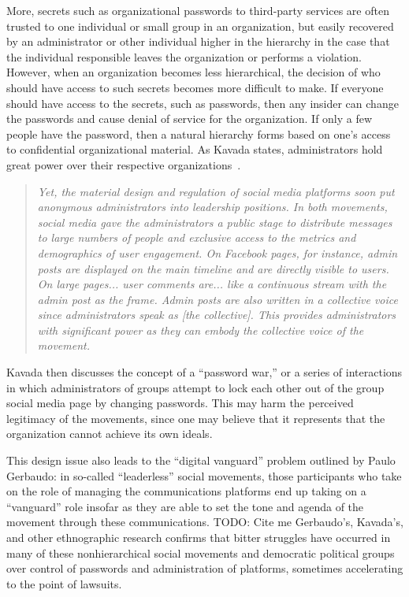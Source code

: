 More, secrets such as organizational passwords to third-party services are often
trusted to one individual or small group in an organization, but easily
recovered by an administrator or other individual higher in the hierarchy in the
case that the individual responsible leaves the organization or performs a
violation. However, when an organization becomes less hierarchical, the decision
of who should have access to such secrets becomes more difficult to make. If
everyone should have access to the secrets, such as passwords, then any insider
can change the passwords and cause denial of service for the organization. If
only a few people have the password, then a natural hierarchy forms based on
one's access to confidential organizational material. As Kavada states,
administrators hold great power over their respective
organizations~\cite{kavada2020counterpublics}.

\begin{quotation}
\textit{Yet, the material design and regulation of social media platforms soon
put anonymous administrators into leadership positions. In both movements,
social media gave the administrators a public stage to distribute messages to
large numbers of people and exclusive access to the metrics and demographics of
user engagement. On Facebook pages, for instance, admin posts are displayed on
the main timeline and are directly visible to users. On large pages... user
comments are... like a continuous stream with the admin post as the frame. Admin
posts are also written in a collective voice since administrators speak as [the
collective]. This provides administrators with significant power as they can
embody the collective voice of the movement.}
\end{quotation}

Kavada then discusses the concept of a ``password war,'' or a series of
interactions in which administrators of groups attempt to lock each other out of
the group social media page by changing passwords. This may harm the perceived
legitimacy of the movements, since one may believe that it represents that the
organization cannot achieve its own ideals.

This design issue also leads to the ``digital vanguard'' problem outlined by
Paulo Gerbaudo: in so-called ``leaderless'' social movements, those participants
who take on the role of managing the communications platforms end up taking on a
``vanguard'' role insofar as they are able to set the tone and agenda of the
movement through these communications.{\color{red} TODO: Cite me} Gerbaudo’s, Kavada's, and other %
ethnographic research confirms that bitter struggles have occurred in many of
these nonhierarchical social movements and democratic political groups over 
control of passwords and administration of platforms, sometimes accelerating to
the point of lawsuits.

